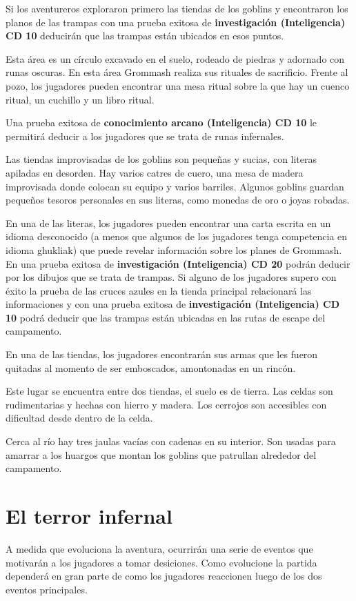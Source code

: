 \documentclass[10pt,twoside,twocolumn,openany]{dndbook}
\begin{document}
Si los aventureros exploraron primero las tiendas de los goblins y encontraron los planos de las 
trampas con una prueba exitosa de \textbf{investigación (Inteligencia) CD 10} deducirán que las 
trampas están ubicados en esos puntos.

Esta área es un círculo excavado en el suelo, rodeado de piedras y adornado con runas oscuras. En 
esta área Grommash realiza sus rituales de sacrificio. Frente al pozo, los jugadores pueden 
encontrar una mesa ritual sobre la que hay un cuenco ritual, un cuchillo y un libro ritual.

Una prueba exitosa de \textbf{conocimiento arcano (Inteligencia) CD 10} le permitirá deducir a 
los jugadores que se trata de runas infernales.

Las tiendas improvisadas de los goblins son pequeñas y sucias, con literas apiladas en desorden. 
Hay varios catres de cuero, una mesa de madera improvisada donde colocan su equipo y varios 
barriles. Algunos goblins guardan pequeños tesoros personales en sus literas, como monedas de oro 
o joyas robadas.

En una de las literas, los jugadores pueden encontrar una carta escrita en un idioma desconocido 
(a menos que algunos de los jugadores tenga competencia en idioma ghukliak) que 
puede revelar información sobre los planes de Grommash. En una prueba exitosa de 
\textbf{investigación (Inteligencia) CD 20} podrán deducir por los dibujos que se trata de 
trampas. Si alguno de los jugadores supero con éxito la prueba de las cruces azules en la tienda 
principal relacionará las informaciones y con una prueba exitosa de 
\textbf{investigación (Inteligencia) CD 10} podrá deducir que las trampas están ubicadas en las
rutas de escape del campamento.

En una de las tiendas, los jugadores encontrarán sus armas que les fueron quitadas al momento de 
ser emboscados, amontonadas en un rincón.

Este lugar se encuentra entre dos tiendas, el suelo es de tierra. Las celdas son rudimentarias
y hechas con hierro y madera. Los cerrojos son accesibles con dificultad desde dentro de la celda.

Cerca al río hay tres jaulas vacías con cadenas en su interior. Son usadas para amarrar a los 
huargos que montan los goblins que patrullan alrededor del campamento.

\section{El terror infernal}
A medida que evoluciona la aventura, ocurrirán una serie de eventos que motivarán a los jugadores 
a tomar desiciones. Como evolucione la partida dependerá en gran parte de como los jugadores 
reaccionen luego de los dos eventos principales.
\end{document}
